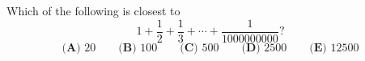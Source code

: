 Which of the following is closest to
\[1+\dfrac12+\dfrac13+\cdots+\dfrac{1}{1000000000}?\]
\[\textbf{(A) }20\qquad\textbf{(B) }100\qquad\textbf{(C) }500\qquad\textbf{(D) }2500\qquad\textbf{(E) }12500\]
